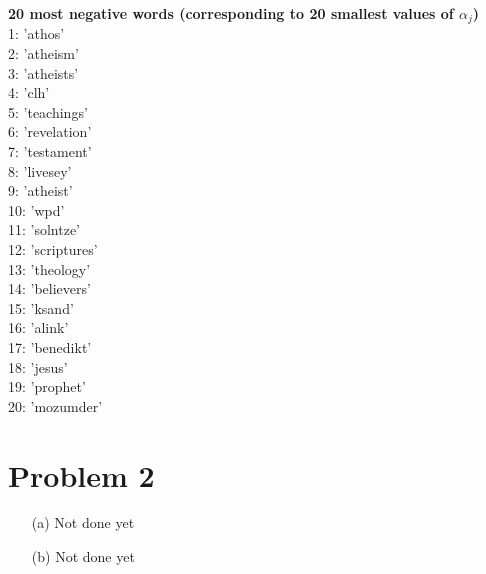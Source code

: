 \documentclass[fleqn]{article}
\begin{document}
\begin{itemize}
                \textbf{20 most negative words (corresponding to 20 smallest values of $\alpha_j$)}\\
                1: 'athos'\\
                2: 'atheism'\\
                3: 'atheists'\\
                4: 'clh'\\
                5: 'teachings'\\
                6: 'revelation'\\
                7: 'testament'\\
                8: 'livesey'\\
                9: 'atheist'\\
                10: 'wpd'\\
                11: 'solntze'\\
                12: 'scriptures'\\
                13: 'theology'\\
                14: 'believers'\\
                15: 'ksand'\\
                16: 'alink'\\
                17: 'benedikt'\\
                18: 'jesus'\\
                19: 'prophet'\\
                20: 'mozumder'\\
\end{itemize}
\section{Problem 2}{}
\begin{itemize}
        \item[(a)] Not done yet
        \item[(b)] Not done yet
\end{itemize}
\end{document}
